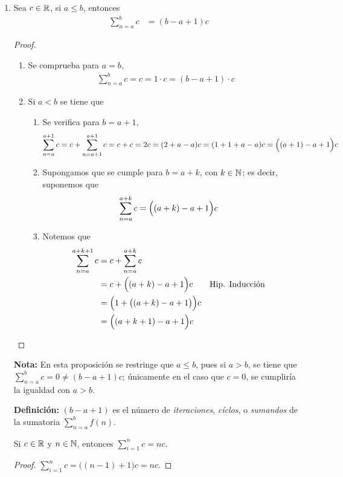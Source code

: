 \begin{enumerate}[label=\alph*)]
  \item Sea $c\in \mathbb{R}$, si $a\leq b$, entonces \begin{align*}
    \sum_{n=a}^b c &= (b-a+1)c
  \end{align*}
  \begin{proof}\leavevmode
    \begin{enumerate}[label=\Roman*)]
      \item Se comprueba para $a=b$, \begin{align*}
        \sum_{n=a}^b c = c = 1\cdot c = (b-a+1)\cdot c
      \end{align*}
      \item Si $a<b$ se tiene que \begin{enumerate}[label=\roman*)]
        \item Se verifica para $b=a+1$, \begin{align*}
          \sum_{n=a}^{a+1} c &= c + \sum_{n=a+1}^{a+1} c = c + c = 2c = (2+a-a)c = (1+1+a-a)c = \Bigl((a+1)-a+1\Bigr) c
        \end{align*}
        \item Supongamos que se cumple para $b=a+k$, con $k\in \mathbb{N}$; es decir, suponemos que \begin{align*}
          \sum_{n=a}^{a+k} c &= \Bigl((a+k)-a+1\Bigr) c
        \end{align*}
        \item Notemos que \begin{align*}
          \sum_{n=a}^{a+k+1} c &= c + \sum_{n=a}^{a+k} c\\
          &= c + \Bigl((a+k)-a+1\Bigr) c && \text{Hip. Inducción}\\
          &= \Bigl(1 + \bigl((a+k)-a+1\bigr) \Bigr)c\\
          &= \Bigl((a+k+1)-a+1\Bigr)c
        \end{align*}
      \end{enumerate}
    \end{enumerate}
  \end{proof}

  \textbf{Nota:} En esta proposición se restringe que $a\leq b$, pues si $a>b$, se tiene que $\sum_{n=a}^{b} c = 0 \neq (b-a+1)c$; únicamente en el caso que $c=0$, se cumpliría la igualdad con $a>b$.

  \textbf{Definición:} $(b-a+1)$ es el número de \textit{iteraciones}, \textit{cíclos}, o \textit{sumandos} de la sumatoria $\sum_{n=a}^{b} f(n)$.

   Si $c\in \mathbb{R}$ y $n\in \mathbb{N}$, entonces $\sum_{i=1}^n c = nc$.
  \begin{proof} $\sum_{i=1}^n c = \bigl((n-1)+1\bigr) c = nc$.
  \end{proof}


\end{enumerate}
